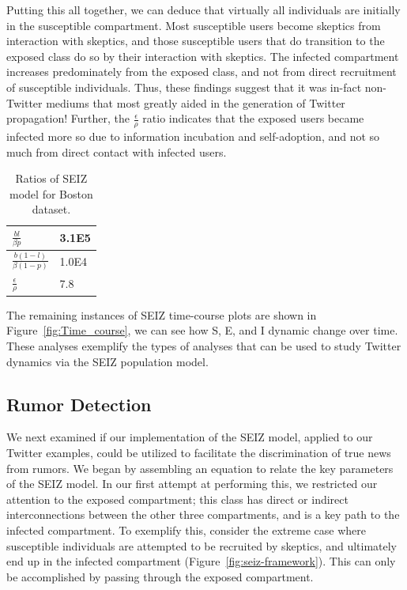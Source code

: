 Putting this all together, we can deduce that virtually all individuals are initially in the susceptible compartment. Most susceptible users become skeptics from interaction with skeptics, and those susceptible users that do transition to the exposed class do so by their interaction with skeptics. The infected compartment increases predominately from the exposed class, and not from direct recruitment of susceptible individuals. Thus, these findings suggest that it was in-fact non-Twitter mediums that most greatly aided in the generation of Twitter propagation! Further, the $\frac{\epsilon}{\rho}$ ratio indicates that the exposed users became infected more so due to information incubation and self-adoption, and not so much from direct contact with infected users.

\begin{table}
\renewcommand{\arraystretch}{2.5}
\small
\centering
\caption{Ratios of SEIZ model for Boston dataset.}
\vspace{0.5em}
\begin{tabular}{|p{2.5cm} |  p{1.5cm}|} \hline
$\displaystyle \frac{bl}{\beta p}$ & 3.1E5\\ \hline
$\displaystyle \frac{b(1-l)}{\beta (1-p)}$ & 1.0E4 \\ \hline
$\displaystyle \frac{\epsilon}{\rho}$ & 7.8\\
\hline\end{tabular}
\label{tab:seiz_boston_bombing}
\end{table}

The remaining instances of SEIZ time-course plots are shown in Figure~\ref{fig:Time_course}, we can see how S, E, and I dynamic change over time. These analyses exemplify the types of analyses that can be used to study Twitter dynamics via the SEIZ population model.

\subsection{Rumor Detection}
We next examined if our implementation of the SEIZ model, applied to our Twitter examples, could be utilized to facilitate the discrimination of true news from rumors. We began by assembling an equation to relate the key parameters of the SEIZ model. In our first attempt at performing this, we restricted our attention to the exposed compartment; this class has direct or indirect interconnections between the other three compartments, and is a key path to the infected compartment. To exemplify this, consider the extreme case where susceptible individuals are attempted to be recruited by skeptics, and ultimately end up in the infected compartment (Figure~\ref{fig:seiz-framework}). This can only be accomplished by passing through the exposed compartment.



